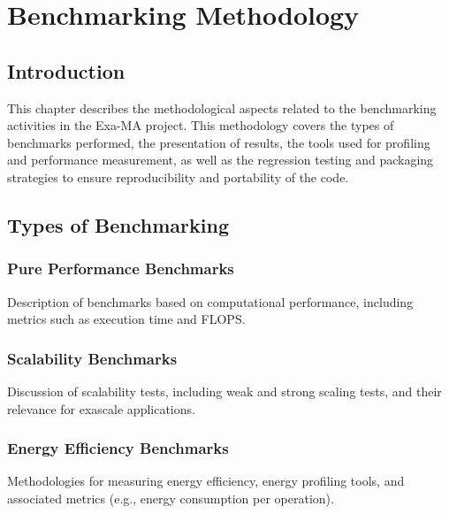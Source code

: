 
\chapter{Benchmarking Methodology}
\label{chap:methodology}

\section{Introduction}
\label{sec:methodology-intro}

This chapter describes the methodological aspects related to the benchmarking activities in the Exa-MA project. 
This methodology covers the types of benchmarks performed, the presentation of results, the tools used for profiling and performance measurement, as well as the regression testing and packaging strategies to ensure reproducibility and portability of the code.

\section{Types of Benchmarking}
\label{sec:methodology-types}

\subsection{Pure Performance Benchmarks}
\label{sec:methodology-types-performance}
Description of benchmarks based on computational performance, including metrics such as execution time and FLOPS.

\subsection{Scalability Benchmarks}
\label{sec:methodology-types-scalability}

Discussion of scalability tests, including weak and strong scaling tests, and their relevance for exascale applications.

\subsection{Energy Efficiency Benchmarks}
\label{sec:methodology-types-energy}

Methodologies for measuring energy efficiency, energy profiling tools, and associated metrics (e.g., energy consumption per operation).

